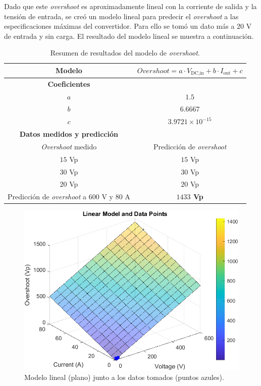 Dado que este \textit{overshoot} es aproximadamente lineal con la corriente de salida y la tensión de entrada, se creó un modelo lineal para predecir el \textit{overshoot} a las especificaciones máximas del convertidor. Para ello se tomó un dato más a 20 V de entrada y sin carga. El resultado del modelo lineal se muestra a continuación.

\begin{table}[H]
	\centering
	\begin{tabular}{|c|c|}
		\hline
		\textbf{Modelo} & $Overshoot = a \cdot V_{\text{DC,in}} + b \cdot I_{\text{out}} + c$ \\
		\hline
		\textbf{Coeficientes} & \\
		\hline
		$a$ & $1.5$ \\
		$b$ & $6.6667$ \\
		$c$ & $3.9721 \times 10^{-15}$ \\
		\hline
		\textbf{Datos medidos y predicción} & \\
		\hline
		\textit{Overshoot} medido & Predicción de \textit{overshoot} \\
		\hline
		$15$ Vp & $15$ Vp \\
		$30$ Vp & $30$ Vp \\
		$20$ Vp & $20$ Vp \\
		\hline
		Predicción de \textit{overshoot} a $600$ V y $80$ A & {\color{red}\textbf{$1433$ Vp}} \\
		\hline
	\end{tabular}
	\caption{Resumen de resultados del modelo de \textit{overshoot}.}
\end{table}

\begin{figure}[H]
	\centering
	\includegraphics[width=0.7\linewidth]{fig/overshootInicial3}
	\caption{Modelo lineal (plano) junto a los datos tomados (puntos azules).}
\end{figure}

